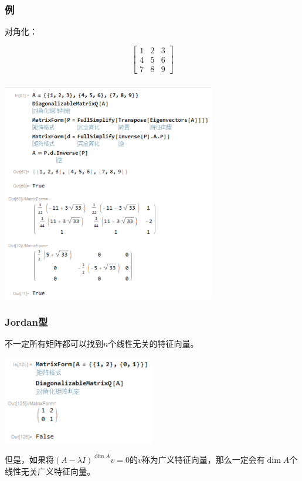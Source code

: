 \documentclass[10pt]{beamer}
\begin{document}
	\begin{frame}
		\frametitle{例}
		
		对角化：
		
		$$
		\begin{bmatrix}
			1&2&3\\
			4&5&6\\
			7&8&9
		\end{bmatrix}
		$$
	\end{frame}
	\begin{frame}
		\frametitle{}
		
		\begin{center}
			\includegraphics[width=0.7\textwidth]{1.PNG}
		\end{center}
	
	\end{frame}
	\begin{frame}
		\frametitle{Jordan型}
	
		不一定所有矩阵都可以找到$n$个线性无关的特征向量。

		\begin{center}
			\includegraphics[width=0.5\textwidth]{2.PNG}
		\end{center}

		但是，如果将$(A-\lambda I)^{\dim A} v=0$的$v$称为广义特征向量，那么一定会有$\dim A$个线性无关广义特征向量。
	
	\end{frame}
\end{document}
